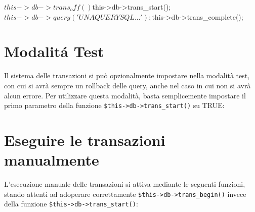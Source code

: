 \begin{code}
$this->db->trans_off()

$this->db->trans_start();
$this->db->query('UNA QUERY SQL...');
$this->db->trans_complete();
\end{code}

\section*{Modalit\'a Test}
Il sistema delle transazioni si può opzionalmente impostare nella modalità test, con cui si avrà sempre un rollback delle query, anche nel caso in cui non si avrà alcun errore. Per utilizzare questa modalità, basta semplicemente impostare il primo parametro della funzione \verb|$this->db->trans_start()| su TRUE:


\section*{Eseguire le transazioni manualmente}
L'esecuzione manuale delle transazioni si attiva mediante le seguenti funzioni, stando attenti ad adoperare correttamente \verb|$this->db->trans_begin()| invece della funzione \verb|$this->db->trans_start()|:

